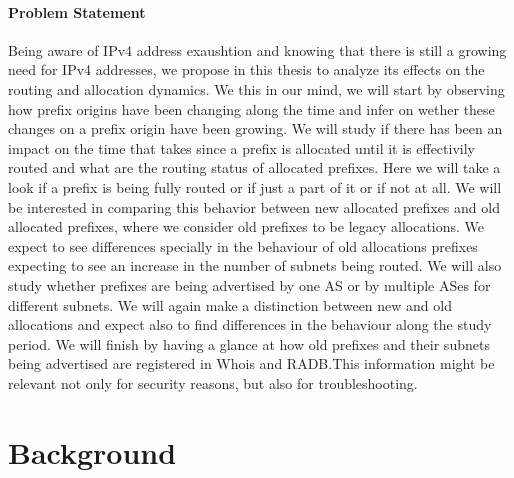 \documentclass[11pt,a4paper]{scrreprt}
\begin{document}
\subsubsection{Problem Statement}

Being aware of IPv4 address exaushtion and knowing that there is still a growing need for IPv4 addresses, we propose in this thesis to analyze its effects on the routing and allocation dynamics. We this in our mind, we will start by observing how prefix origins have been changing along the time and infer on wether these changes on a prefix origin have been growing. We will study if there has been an impact on the time that takes since a prefix is allocated until it is effectivily routed and what are the routing status of allocated prefixes. Here we will take a look if a prefix is being fully routed or if just a part of it or if not at all. We will be interested in comparing this behavior between new allocated prefixes and old allocated prefixes, where we consider old prefixes to be legacy allocations. We expect to see differences specially in the behaviour of old allocations prefixes expecting to see an increase in the number of subnets being routed. 
We will also study whether prefixes are being advertised by one AS or by multiple ASes for different subnets. We will again make a distinction between new and old allocations and expect also to find differences in the behaviour along the study period. We will finish by having a glance at how old prefixes and their subnets being advertised are registered in Whois and RADB.This information might be relevant not only for security reasons, but also for troubleshooting.   



\chapter{Background}
\end{document}
